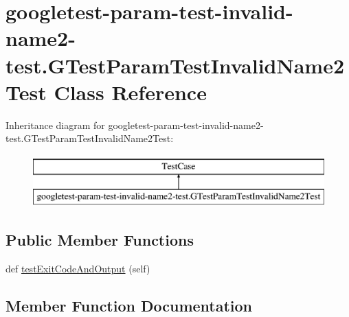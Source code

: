 \hypertarget{classgoogletest-param-test-invalid-name2-test_1_1_g_test_param_test_invalid_name2_test}{}\section{googletest-\/param-\/test-\/invalid-\/name2-\/test.G\+Test\+Param\+Test\+Invalid\+Name2\+Test Class Reference}
\label{classgoogletest-param-test-invalid-name2-test_1_1_g_test_param_test_invalid_name2_test}
Inheritance diagram for googletest-\/param-\/test-\/invalid-\/name2-\/test.G\+Test\+Param\+Test\+Invalid\+Name2\+Test\+:\begin{figure}[H]
\begin{center}
\leavevmode
\includegraphics[height=2.000000cm]{d1/d9e/classgoogletest-param-test-invalid-name2-test_1_1_g_test_param_test_invalid_name2_test}
\end{center}
\end{figure}
\subsection*{Public Member Functions}
\begin{DoxyCompactItemize}
\item 
def \mbox{\hyperlink{classgoogletest-param-test-invalid-name2-test_1_1_g_test_param_test_invalid_name2_test_a3fbc22a46315dc7ba10f0203349de7c7}{test\+Exit\+Code\+And\+Output}} (self)
\end{DoxyCompactItemize}


\subsection{Member Function Documentation}
\mbox{\label{classgoogletest-param-test-invalid-name2-test_1_1_g_test_param_test_invalid_name2_test_a3fbc22a46315dc7ba10f0203349de7c7}} 
